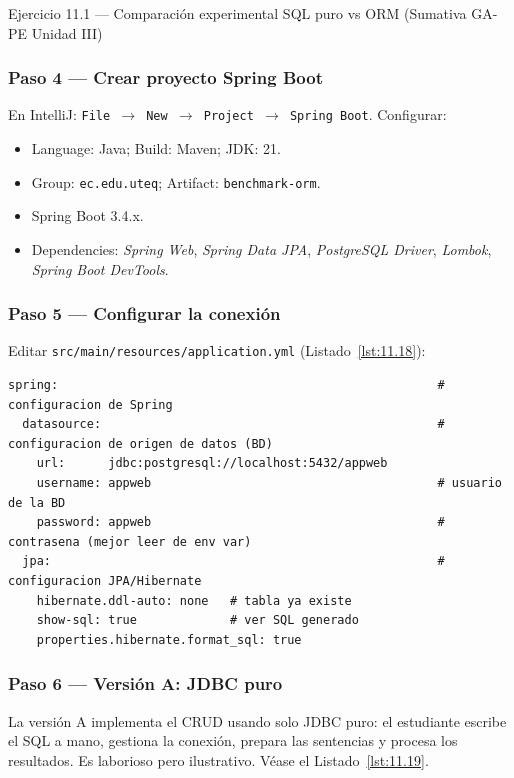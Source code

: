\documentclass[11pt,a4paper,openany]{book}
\begin{document}
\begin{cajaejercicio}{Ejercicio 11.1 --- Comparación experimental SQL puro vs ORM (Sumativa GA-PE Unidad III)}
\subsubsection*{Paso 4 --- Crear proyecto Spring Boot}

En IntelliJ: \texttt{File $\rightarrow$ New $\rightarrow$ Project
$\rightarrow$ Spring Boot}. Configurar:
\begin{itemize}
\item Language: Java; Build: Maven; JDK: 21.
\item Group: \texttt{ec.edu.uteq}; Artifact: \texttt{benchmark-orm}.
\item Spring Boot 3.4.x.
\item Dependencies: \emph{Spring Web}, \emph{Spring Data JPA},
\emph{PostgreSQL Driver}, \emph{Lombok}, \emph{Spring Boot DevTools}.
\end{itemize}

\subsubsection*{Paso 5 --- Configurar la conexión}

Editar \texttt{src/main/resources/application.yml} (Listado~\ref{lst:11.18}):

\begin{lstlisting}[style=yaml,numbers=none,caption={Ejemplo de YAML},label=lst:11.18]
spring:                                                     # configuracion de Spring
  datasource:                                               # configuracion de origen de datos (BD)
    url:      jdbc:postgresql://localhost:5432/appweb
    username: appweb                                        # usuario de la BD
    password: appweb                                        # contrasena (mejor leer de env var)
  jpa:                                                      # configuracion JPA/Hibernate
    hibernate.ddl-auto: none   # tabla ya existe
    show-sql: true             # ver SQL generado
    properties.hibernate.format_sql: true
\end{lstlisting}

\subsubsection*{Paso 6 --- Versión A: JDBC puro}

La versión A implementa el CRUD usando solo JDBC puro: el
estudiante escribe el SQL a mano, gestiona la conexión, prepara las
sentencias y procesa los resultados. Es laborioso pero ilustrativo. V\'ease el Listado~\ref{lst:11.19}.



\end{cajaejercicio}
\end{document}
